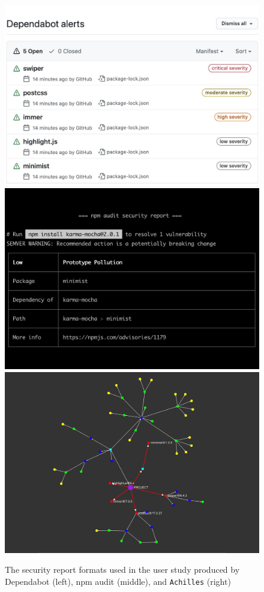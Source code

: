 \documentclass[conference]{IEEEtran}
\begin{document}
	
	
	
	\begin{figure}[ht!]
		\includegraphics[width=.3\textwidth]{Figures/screenshot-dependabot.jpeg}\hfill
		\includegraphics[width=.3\textwidth]{Figures/screenshot-npm-audit.png}\hfill
		\includegraphics[width=.3\textwidth]{Figures/screenshot-achilles.png}
		\caption{The security report formats used in the user study produced by Dependabot (left), npm audit (middle), and \texttt{Achilles} (right)}
	\end{figure}
	
\end{document}
